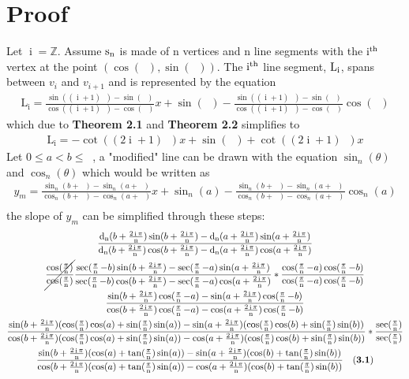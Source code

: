 \documentclass[11pt]{article}
\DeclareMathOperator{\custd}{\mathrm{d}_n}
\DeclareMathOperator{\custi}{\mathrm{i}}
\DeclareMathOperator{\period}{\frac{2\pi}{n}}
\DeclareMathOperator{\hp}{\frac{\pi}{n}}
\DeclareMathOperator{\iperiod}{\frac{2\custi\pi}{n}}
\begin{document}
\section{Proof}
Let \(\custi=\mathbb{Z}\). Assume \(\rm s_n\) is made of n vertices and n line segments with the \(\rm i^{th}\) vertex at the point \((\cos(\iperiod), \sin(\iperiod))\). The \(\rm i^{th}\) line segment, \(\rm L_i\), spans between \(v_i\) and \(v_{i+1}\) and is represented by the equation
\begin{gather*}
\mathrm{L_i}=\frac{\sin((\custi+1)\period)-\sin(\iperiod)}{\cos((\custi+1)\period)-\cos(\iperiod)}x+\sin(\iperiod)-\frac{\sin((\custi+1)\period)-\sin(\iperiod)}{\cos((\custi+1)\period)-\cos(\iperiod)}\cos(\iperiod)
\end{gather*}
which due to \textbf{Theorem 2.1} and \textbf{Theorem 2.2} simplifies to 
\begin{gather*}
\mathrm{L_i}=-\cot((2\custi+1)\hp)x+\sin(\iperiod)+\cot((2\custi+1)\hp)x
\end{gather*}
Let \(0\leq a<b\leq\period\), a "modified" line can be drawn with the equation \(\sin_n(\theta)\) and \(\cos_n(\theta)\) which would be written as
\begin{gather*}
y_m=\frac{\sin_n(b+\iperiod)-\sin_n(a+\iperiod)}{\cos_n(b+\iperiod)-\cos_n(a+\iperiod)}x+\sin_n(a)-\frac{\sin_n(b+\iperiod)-\sin_n(a+\iperiod)}{\cos_n(b+\iperiod)-\cos_n(a+\iperiod)}\cos_n(a)\\
\end{gather*}
the slope of \(y_m\) can be simplified through these steps:
\begin{gather*}
\frac{\custd(b+\iperiod)\sin(b+\iperiod)-\custd(a+\iperiod)\sin(a+\iperiod)}{\custd(b+\iperiod)\cos(b+\iperiod)-\custd(a+\iperiod)\cos(a+\iperiod)}\\
\cancel{\frac{\cos(\hp)}{\cos(\hp)}}\frac{\sec(\hp-b)\sin(b+\iperiod)-\sec(\hp-a)\sin(a+\iperiod)}{\sec(\hp-b)\cos(b+\iperiod)-\sec(\hp-a)\cos(a+\iperiod)}*\frac{\cos(\hp-a)\cos(\hp-b)}{\cos(\hp-a)\cos(\hp-b)}\\
\frac{\sin(b+\iperiod)\cos(\hp-a)-\sin(a+\iperiod)\cos(\hp-b)}{\cos(b+\iperiod)\cos(\hp-a)-\cos(a+\iperiod)\cos(\hp-b)}\\
\frac{\sin(b+\iperiod)(\cos(\hp)\cos(a)+\sin(\hp)\sin(a))-\sin(a+\iperiod)(\cos(\hp)\cos(b)+\sin(\hp)\sin(b))}{\cos(b+\iperiod)(\cos(\hp)\cos(a)+\sin(\hp)\sin(a))-\cos(a+\iperiod)(\cos(\hp)\cos(b)+\sin(\hp)\sin(b))}*\frac{\sec(\hp)}{\sec(\hp)}\\
\frac{\sin(b+\iperiod)(\cos(a)+\tan(\hp)\sin(a))-\sin(a+\iperiod)(\cos(b)+\tan(\hp)\sin(b))}{\cos(b+\iperiod)(\cos(a)+\tan(\hp)\sin(a))-\cos(a+\iperiod)(\cos(b)+\tan(\hp)\sin(b))} \ \ \ \mathrm{(\textbf{3.1})}
\end{gather*}
\end{document}
